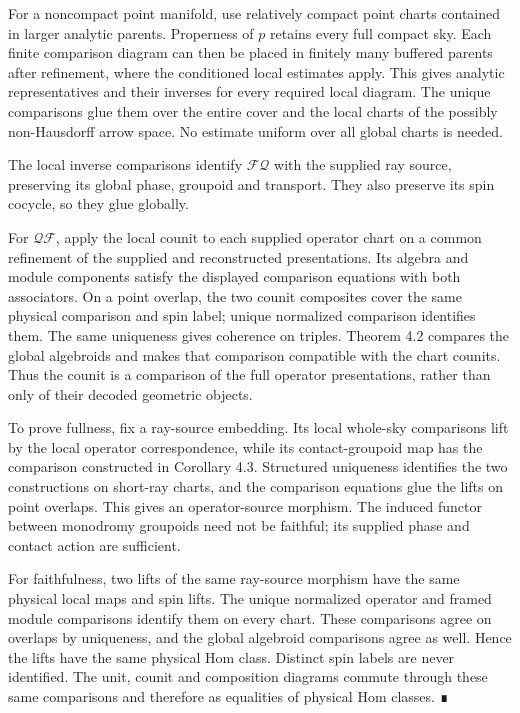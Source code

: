 \documentclass[
  english,
  11pt,
  reqno]{amsart}
\begin{document}
For a noncompact point manifold, use relatively compact point charts
contained in larger analytic parents. Properness of \(p\) retains every
full compact sky. Each finite comparison diagram can then be placed in
finitely many buffered parents after refinement, where the conditioned
local estimates apply. This gives analytic representatives and their
inverses for every required local diagram. The unique comparisons glue
them over the entire cover and the local charts of the possibly
non-Hausdorff arrow space. No estimate uniform over all global charts is
needed.

The local inverse comparisons identify \(\mathcal F\mathcal Q\) with the
supplied ray source, preserving its global phase, groupoid and
transport. They also preserve its spin cocycle, so they glue globally.

For \(\mathcal Q\mathcal F\), apply the local counit to each supplied
operator chart on a common refinement of the supplied and reconstructed
presentations. Its algebra and module components satisfy the displayed
comparison equations with both associators. On a point overlap, the two
counit composites cover the same physical comparison and spin label;
unique normalized comparison identifies them. The same uniqueness gives
coherence on triples. Theorem 4.2 compares the global algebroids and
makes that comparison compatible with the chart counits. Thus the counit
is a comparison of the full operator presentations, rather than only of
their decoded geometric objects.

To prove fullness, fix a ray-source embedding. Its local whole-sky
comparisons lift by the local operator correspondence, while its
contact-groupoid map has the comparison constructed in Corollary 4.3.
Structured uniqueness identifies the two constructions on short-ray
charts, and the comparison equations glue the lifts on point overlaps.
This gives an operator-source morphism. The induced functor between
monodromy groupoids need not be faithful; its supplied phase and contact
action are sufficient.

For faithfulness, two lifts of the same ray-source morphism have the
same physical local maps and spin lifts. The unique normalized operator
and framed module comparisons identify them on every chart. These
comparisons agree on overlaps by uniqueness, and the global algebroid
comparisons agree as well. Hence the lifts have the same physical Hom
class. Distinct spin labels are never identified. The unit, counit and
composition diagrams commute through these same comparisons and
therefore as equalities of physical Hom classes. ∎
\end{document}

